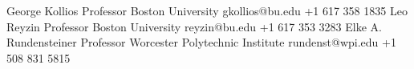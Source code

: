 
	\begin{referees}
			{George Kollios}
			{Professor}
			{Boston University}
			{gkollios@bu.edu}
			{+1 617 358 1835}
			{Leo Reyzin}
			{Professor}
			{Boston University}
			{reyzin@bu.edu}
			{+1 617 353 3283}
			{Elke A. Rundensteiner}
			{Professor}
			{Worcester Polytechnic Institute}
			{rundenst@wpi.edu}
			{+1 508 831 5815}
	\end{referees}
